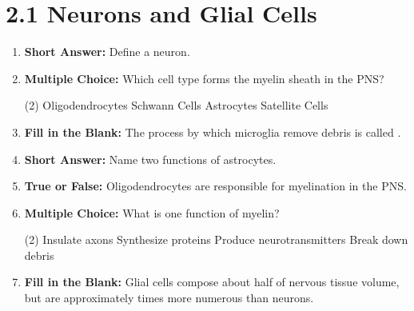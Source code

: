 \section*{2.1 Neurons and Glial Cells}
\begin{enumerate}[label=\textbf{Q2.1.\arabic*}]
      \item \textbf{Short Answer:} Define a neuron. \\
      \item \textbf{Multiple Choice:} Which cell type forms the myelin sheath in the PNS?
            \begin{tasks}[label=(\Alph*), label-width=1.5em, item-indent=1.7em](2)
                  \task Oligodendrocytes
                  \task Schwann Cells
                  \task Astrocytes
                  \task Satellite Cells
            \end{tasks}
      \item \textbf{Fill in the Blank:} The process by which microglia remove debris is called \underline{\hspace{3cm}}. \\
      \item \textbf{Short Answer:} Name two functions of astrocytes. \\
      \item \textbf{True or False:} Oligodendrocytes are responsible for myelination in the PNS. \\
      \item \textbf{Multiple Choice:} What is one function of myelin?
            \begin{tasks}[label=(\Alph*), label-width=1.5em, item-indent=1.7em](2)
                  \task Insulate axons
                  \task Synthesize proteins
                  \task Produce neurotransmitters
                  \task Break down debris
            \end{tasks}
      \item \textbf{Fill in the Blank:} Glial cells compose about half of nervous tissue volume, but are approximately \underline{\hspace{3cm}} times more numerous than neurons. \\


\end{enumerate}
